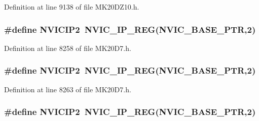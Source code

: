 Definition at line 9138 of file M\+K20\+D\+Z10.\+h.

\subsubsection[{\texorpdfstring{N\+V\+I\+C\+I\+P2}{NVICIP2}}]{\setlength{\rightskip}{0pt plus 5cm}\#define N\+V\+I\+C\+I\+P2~{\bf N\+V\+I\+C\+\_\+\+I\+P\+\_\+\+R\+EG}({\bf N\+V\+I\+C\+\_\+\+B\+A\+S\+E\+\_\+\+P\+TR},2)}\hypertarget{group___n_v_i_c___register___accessor___macros_ga48b8558567ff13d292bdfcb727bae8ce}{}\label{group___n_v_i_c___register___accessor___macros_ga48b8558567ff13d292bdfcb727bae8ce}


Definition at line 8258 of file M\+K20\+D7.\+h.

\subsubsection[{\texorpdfstring{N\+V\+I\+C\+I\+P2}{NVICIP2}}]{\setlength{\rightskip}{0pt plus 5cm}\#define N\+V\+I\+C\+I\+P2~{\bf N\+V\+I\+C\+\_\+\+I\+P\+\_\+\+R\+EG}({\bf N\+V\+I\+C\+\_\+\+B\+A\+S\+E\+\_\+\+P\+TR},2)}\hypertarget{group___n_v_i_c___register___accessor___macros_ga48b8558567ff13d292bdfcb727bae8ce}{}\label{group___n_v_i_c___register___accessor___macros_ga48b8558567ff13d292bdfcb727bae8ce}


Definition at line 8263 of file M\+K20\+D7.\+h.

\subsubsection[{\texorpdfstring{N\+V\+I\+C\+I\+P2}{NVICIP2}}]{\setlength{\rightskip}{0pt plus 5cm}\#define N\+V\+I\+C\+I\+P2~{\bf N\+V\+I\+C\+\_\+\+I\+P\+\_\+\+R\+EG}({\bf N\+V\+I\+C\+\_\+\+B\+A\+S\+E\+\_\+\+P\+TR},2)}\hypertarget{group___n_v_i_c___register___accessor___macros_ga48b8558567ff13d292bdfcb727bae8ce}{}\label{group___n_v_i_c___register___accessor___macros_ga48b8558567ff13d292bdfcb727bae8ce}


